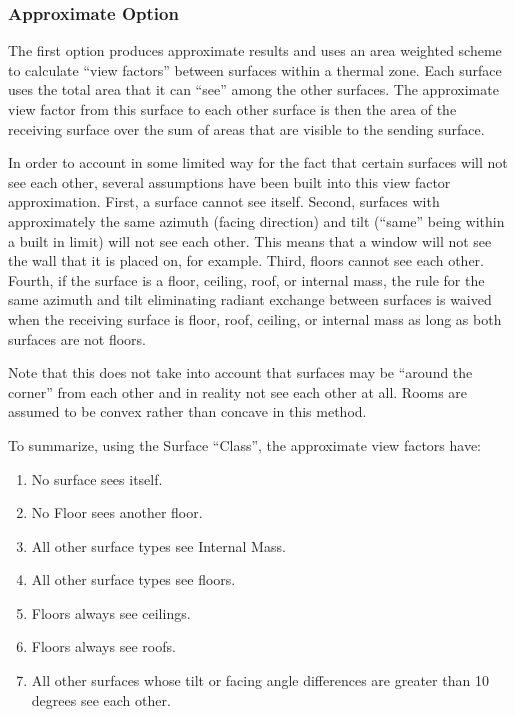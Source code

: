 \subsubsection{Approximate Option}\label{approximate-option}

The first option produces approximate results and uses an area weighted scheme to calculate ``view factors'' between surfaces within a thermal zone. Each surface uses the total area that it can ``see'' among the other surfaces. The approximate view factor from this surface to each other surface is then the area of the receiving surface over the sum of areas that are visible to the sending surface.

In order to account in some limited way for the fact that certain surfaces will not see each other, several assumptions have been built into this view factor approximation. First, a surface cannot see itself. Second, surfaces with approximately the same azimuth (facing direction) and tilt (``same'' being within a built in limit) will not see each other. This means that a window will not see the wall that it is placed on, for example. Third, floors cannot see each other. Fourth, if the surface is a floor, ceiling, roof, or internal mass, the rule for the same azimuth and tilt eliminating radiant exchange between surfaces is waived when the receiving surface is floor, roof, ceiling, or internal mass as long as both surfaces are not floors.

Note that this does not take into account that surfaces may be ``around the corner'' from each other and in reality not see each other at all. Rooms are assumed to be convex rather than concave in this method.

To summarize, using the Surface ``Class'', the approximate view factors have:

\begin{enumerate}
  \item
    No surface sees itself.
  \item
    No Floor sees another floor.
  \item
    All other surface types see Internal Mass.
  \item
    All other surface types see floors.
  \item
    Floors always see ceilings.
  \item
    Floors always see roofs.
  \item
    All other surfaces whose tilt or facing angle differences are greater than 10 degrees see each other.
\end{enumerate}

